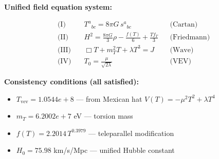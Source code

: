 
\textbf{Unified field equation system:}

\begin{align}
  \text{(I)} \quad & T^a{}_{bc} = 8\pi G \, s^a{}_{bc} && \text{(Cartan)} \\
  \text{(II)} \quad & H^2 = \frac{8\pi G}{3}\rho - \frac{f(T)}{6} + \frac{Tf_T}{3} && \text{(Friedmann)} \\
  \text{(III)} \quad & \Box T + m_T^2 T + \lambda T^3 = J && \text{(Wave)} \\
  \text{(IV)} \quad & T_0 = \frac{\mu}{\sqrt{2\lambda}} && \text{(VEV)}
\end{align}

\textbf{Consistency conditions (all satisfied):}
\begin{itemize}
  \item $T_{\text{vev}} = 1.0544e+8$ — from Mexican hat $V(T) = -\mu^2 T^2 + \lambda T^4$
  \item $m_T = 6.2002e+7$ eV — torsion mass
  \item $f(T) = 2.2014 \, T^{0.3979}$ — teleparallel modification
  \item $H_0 = 75.98$ km/s/Mpc — unified Hubble constant
\end{itemize}